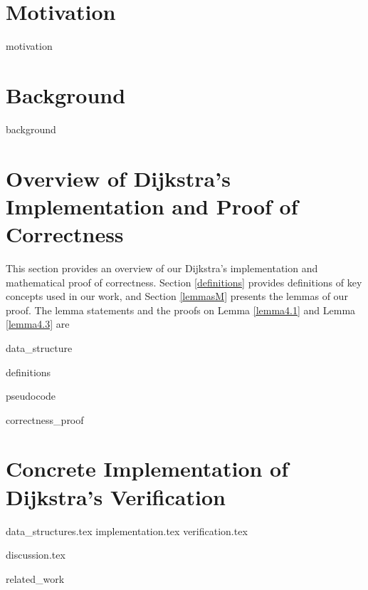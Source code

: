 \documentclass[11pt, a4paper]{article} %
\theoremstyle{definition}
\begin{document}
\section{Motivation}
{motivation}

\section{Background}
{background}

\section{Overview of Dijkstra's Implementation and Proof of Correctness}
This section provides an overview of our Dijkstra's implementation and mathematical proof of correctness. Section \ref{definitions} provides definitions of key concepts used in our work, and Section \ref{lemmasM} presents the lemmas of our proof. The lemma statements and the proofs on Lemma \ref{lemma4.1} and Lemma \ref{lemma4.3} are 

{data_structure}

{definitions}

{pseudocode}

{correctness_proof}


\section{Concrete Implementation of Dijkstra's Verification}
{data_structures.tex}
{implementation.tex}
{verification.tex}


{discussion.tex}


{related_work}
\end{document}
